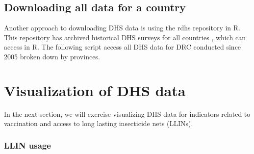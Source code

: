 \documentclass[
  letterpaper,
  DIV=11,
  numbers=noendperiod]{scrreprt}
\newenvironment{Shaded}{\begin{snugshade}}{\end{snugshade}}
\newcommand{\AttributeTok}[1]{\textcolor[rgb]{0.40,0.45,0.13}{#1}}
\newcommand{\CommentTok}[1]{\textcolor[rgb]{0.37,0.37,0.37}{#1}}
\newcommand{\DecValTok}[1]{\textcolor[rgb]{0.68,0.00,0.00}{#1}}
\newcommand{\FunctionTok}[1]{\textcolor[rgb]{0.28,0.35,0.67}{#1}}
\newcommand{\NormalTok}[1]{\textcolor[rgb]{0.00,0.23,0.31}{#1}}
\newcommand{\OtherTok}[1]{\textcolor[rgb]{0.00,0.23,0.31}{#1}}
\newcommand{\SpecialCharTok}[1]{\textcolor[rgb]{0.37,0.37,0.37}{#1}}
\newcommand{\StringTok}[1]{\textcolor[rgb]{0.13,0.47,0.30}{#1}}
\begin{document}
\hypertarget{downloading-all-data-for-a-country}{%
\section{Downloading all data for a
country}\label{downloading-all-data-for-a-country}}

Another approach to downloading DHS data is using the rdhs repository in
R. This repository has archived historical DHS surveys for all countries
, which can access in R. The following script access all DHS data for
DRC conducted since 2005 broken down by provinces.

\begin{Shaded}
\end{Shaded}


\hypertarget{visualization-of-dhs-data}{%
\chapter{Visualization of DHS data}\label{visualization-of-dhs-data}}

In the next section, we will exercise visualizing DHS data for
indicators related to vaccination and access to long lasting insecticide
nets (LLINs).

\hypertarget{llin-usage}{%
\subsection{LLIN usage}\label{llin-usage}}
\end{document}
